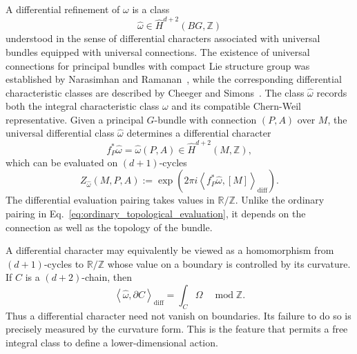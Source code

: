 \documentclass[aps,prx,reprint,superscriptaddress,twocolumn,amsmath,amssymb,amsfonts, nofootinbib]{revtex4-2}
\theoremstyle{apsstyle}
\begin{document}
\noindent A differential refinement of $\omega$ is a class
\begin{equation*}
    \widehat\omega
    \in
    \widehat H^{d+2}(BG,\mathbb Z)
\end{equation*}
understood in the sense of differential characters associated with universal bundles equipped with universal connections. The existence of universal connections for principal bundles with compact Lie structure group was established by Narasimhan and Ramanan~\cite{Narasimhan1961}, while the corresponding differential characteristic classes are described by Cheeger and Simons~\cite{CheegerSimons1985}. The class $\widehat\omega$ records both the integral characteristic class $\omega$ and its compatible Chern-Weil representative.
Given a principal $G$-bundle with connection $(P,A)$ over $M$, the universal differential class $\widehat\omega$ determines a differential character
\begin{equation*}
    f_{P}^{*}\widehat\omega=\widehat\omega(P,A)
    \in
    \widehat H^{d+2}(M,\mathbb Z),
\end{equation*}
which can be evaluated on $(d+1)$-cycles
\begin{equation}
    Z_{\widehat\omega}(M,P,A)
    :=
    \exp\left(
        2\pi i
        \left\langle
            f_P^*\widehat\omega,
            [M]
        \right\rangle_{\mathrm{diff}}
    \right).
    \label{eq:differential_character_evaluation}
\end{equation}
The differential evaluation pairing takes values in
$\mathbb R/\mathbb Z$. Unlike the ordinary pairing in
Eq.~\eqref{eq:ordinary_topological_evaluation}, it depends on the
connection as well as the topology of the bundle.

\bigskip 

A differential character may equivalently be viewed as a homomorphism
from $(d+1)$-cycles to $\mathbb R/\mathbb Z$ whose value on a boundary
is controlled by its curvature. If $C$ is a $(d+2)$-chain, then
\begin{equation}
    \left\langle
        \widehat\omega,
        \partial C
    \right\rangle_{\mathrm{diff}}
    =
    \int_C\Omega
    \quad
    \operatorname{mod}\mathbb Z.
    \label{eq:differential_character_boundary}
\end{equation}
Thus a differential character need not vanish on boundaries. Its
failure to do so is precisely measured by the curvature form. This is
the feature that permits a free integral class to define a
lower-dimensional action.
\end{document}
